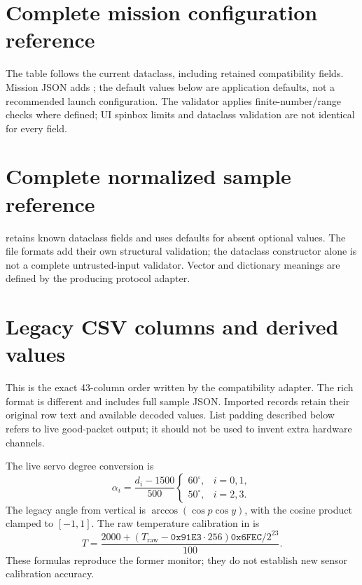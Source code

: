 \section{Complete mission configuration reference}\label{app:mission}
The table follows the current  dataclass, including retained
compatibility fields. Mission JSON adds ; the default
values below are application defaults, not a recommended launch configuration.
The validator applies finite-number/range checks where defined; UI spinbox
limits and dataclass validation are not identical for every field.


\section{Complete normalized sample reference}\label{app:sample}
 retains known dataclass fields and uses defaults for
absent optional values. The file formats add their own structural validation;
the dataclass constructor alone is not a complete untrusted-input validator.
Vector and dictionary meanings are defined by the producing protocol adapter.


\section{Legacy CSV columns and derived values}\label{app:csv}
This is the exact 43-column order written by the compatibility adapter.
The rich  format is different and includes full
sample JSON. Imported records retain their original row text and available
decoded values. List padding described below refers to live good-packet output;
it should not be used to invent extra hardware channels.


The live servo degree conversion is
\[
 \alpha_i=\frac{d_i-1500}{500}
 \begin{cases}60^\circ,& i=0,1,\\50^\circ,& i=2,3.\end{cases}
\]
The legacy angle from vertical is
\(\arccos(\cos p\cos y)\), with the cosine product clamped to \([-1,1]\).
The raw temperature calibration in  is
\[
 T=\frac{2000+(T_{\mathrm{raw}}-\texttt{0x91E3}\cdot256)
                    \texttt{0x6FEC}/2^{23}}{100}.
\]
These formulas reproduce the former monitor; they do not establish new sensor
calibration accuracy.

